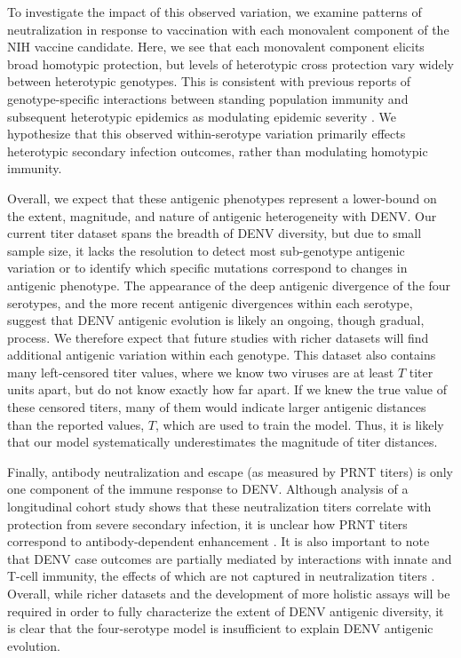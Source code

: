 \documentclass[11pt,oneside,letterpaper]{article}
\begin{document}
To investigate the impact of this observed variation, we examine patterns of neutralization in response to vaccination with each monovalent component of the NIH vaccine candidate.
Here, we see that each monovalent component elicits broad homotypic protection, but levels of heterotypic cross protection vary widely between heterotypic genotypes.
This is consistent with previous reports of genotype-specific interactions between standing population immunity and subsequent heterotypic epidemics as modulating epidemic severity \citep{ohainle2011dynamics, kochel2002effect}.
We hypothesize that this observed within-serotype variation primarily effects heterotypic secondary infection outcomes, rather than modulating homotypic immunity.

Overall, we expect that these antigenic phenotypes represent a lower-bound on the extent, magnitude, and nature of antigenic heterogeneity with DENV.
Our current titer dataset spans the breadth of DENV diversity, but due to small sample size, it lacks the resolution to detect most sub-genotype antigenic variation or to identify which specific mutations correspond to changes in antigenic phenotype.
The appearance of the deep antigenic divergence of the four serotypes, and the more recent antigenic divergences within each serotype, suggest that DENV antigenic evolution is likely an ongoing, though gradual, process.
We therefore expect that future studies with richer datasets will find additional antigenic variation within each genotype.
This dataset also contains many left-censored titer values, where we know two viruses are at least $T$ titer units apart, but do not know exactly how far apart.
If we knew the true value of these censored titers, many of them would indicate larger antigenic distances than the reported values, $T$, which are used to train the model.
Thus, it is likely that our model systematically underestimates the magnitude of titer distances.

Finally, antibody neutralization and escape (as measured by PRNT titers) is only one component of the immune response to DENV.
Although analysis of a longitudinal cohort study shows that these neutralization titers correlate with protection from severe secondary infection, it is unclear how PRNT titers correspond to antibody-dependent enhancement \citep{katzelnick2016neutralizing}.
It is also important to note that DENV case outcomes are partially mediated by interactions with innate and T-cell immunity, the effects of which are not captured in neutralization titers \citep{green2014innate}.
Overall, while richer datasets and the development of more holistic assays will be required in order to fully characterize the extent of DENV antigenic diversity, it is clear that the four-serotype model is insufficient to explain DENV antigenic evolution.
\end{document}
